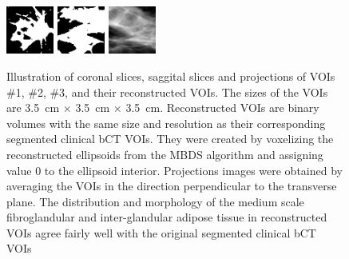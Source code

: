 \documentclass[journal]{IEEEtran}
\begin{document}
\begin{figure}[!htb]
  \includegraphics[width=0.14\textwidth]
  {figure/all/dataset_11/roi_coronal}
  \includegraphics[width=0.14\textwidth]
  {figure/all/dataset_11/roi_saggital}
  \includegraphics[width=0.14\textwidth]
  {figure/all/dataset_11/proj_roi}


  \caption{Illustration of coronal slices, saggital slices and
    projections of VOIs \#1, \#2, \#3, and their reconstructed
    VOIs. The sizes of the VOIs are \SI{3.5}{\cm} $\times$
    \SI{3.5}{\cm} $\times$ \SI{3.5}{\cm}. Reconstructed VOIs are
    binary volumes with the same size and resolution as their
    corresponding segmented clinical bCT VOIs. They were created by
    voxelizing the reconstructed ellipsoids from the MBDS algorithm
    and assigning value 0 to the ellipsoid interior. Projections
    images were obtained by averaging the VOIs in the direction
    perpendicular to the transverse plane. The distribution and
    morphology of the medium scale fibroglandular and inter-glandular
    adipose tissue in reconstructed VOIs agree fairly well with the
    original segmented clinical bCT VOIs}
  \label{fig:bct-datasets-recon}

\end{figure}
\end{document}
